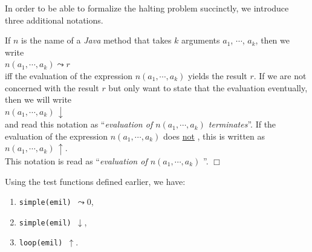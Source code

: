 In order to be able to formalize the halting problem succinctly, we introduce three additional
notations.
\begin{Notation}[$\leadsto$, $\downarrow$, $\uparrow$]
If $n$ is the name of a \textsl{Java} method that takes $k$ arguments $a_1$, $\cdots$, $a_k$,
then we write 
\\[0.2cm]
\hspace*{1.3cm}
 $n(a_1, \cdots, a_k) \leadsto r$ 
\\[0.2cm]
iff the evaluation of the expression $n(a_1, \cdots, a_k)$ yields the result $r$.
If we are not
concerned with the result $r$ but only want to state that the evaluation  eventually,
then we will write
\\[0.2cm]
\hspace*{1.3cm} $n(a_1, \cdots, a_k) \,\downarrow$ \\[0.3cm]
and read this notation as ``\emph{evaluation of $n(a_1, \cdots, a_k)$ terminates}''.
If the evaluation of the expression $n(a_1, \cdots, a_k)$ does \underline{not} , this is
written as \\[0.2cm]
\hspace*{1.3cm}
 $n(a_1, \cdots, a_k) \,\uparrow$.
\\[0.2cm]
This notation is read as ``\emph{evaluation of $n(a_1, \cdots, a_k)$ }''.
\hspace*{\fill} $\Box$
\end{Notation}

\examplesEng  Using the test functions defined earlier, we have:
\begin{enumerate}
\item {\tt simple(emil) $\leadsto 0$},
\item {\tt simple(emil) $\downarrow$},
\item {\tt loop(emil) $\uparrow$}.
\end{enumerate}

